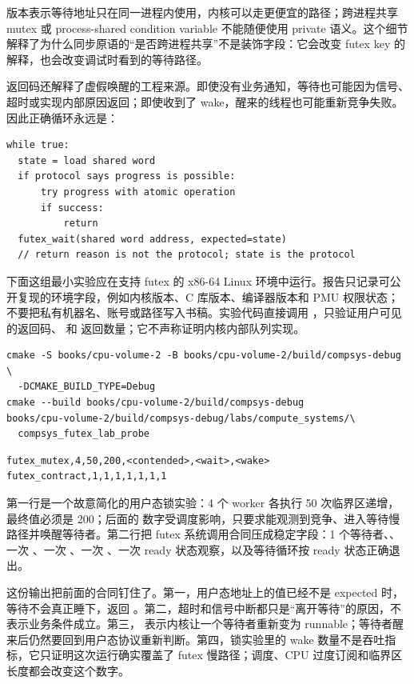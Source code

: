  版本表示等待地址只在同一进程内使用，内核可以走更便宜的路径；跨进程共享 mutex 或 process-shared condition variable 不能随便使用 private 语义。这个细节解释了为什么同步原语的“是否跨进程共享”不是装饰字段：它会改变 futex key 的解释，也会改变调试时看到的等待路径。

返回码还解释了虚假唤醒的工程来源。即使没有业务通知，等待也可能因为信号、超时或实现内部原因返回；即使收到了 wake，醒来的线程也可能重新竞争失败。因此正确循环永远是：

\begin{lstlisting}[numbers=none,caption={futex 用户态循环必须以状态为准}]
while true:
  state = load shared word
  if protocol says progress is possible:
      try progress with atomic operation
      if success:
          return
  futex_wait(shared word address, expected=state)
  // return reason is not the protocol; state is the protocol
\end{lstlisting}

下面这组最小实验应在支持 futex 的 x86-64 Linux 环境中运行。报告只记录可公开复现的环境字段，例如内核版本、C 库版本、编译器版本和 PMU 权限状态；不要把私有机器名、账号或路径写入书稿。实验代码直接调用 ，只验证用户可见的返回码、 和  返回数量；它不声称证明内核内部队列实现。

\begin{lstlisting}[numbers=none,caption={futex 合同实验命令}]
cmake -S books/cpu-volume-2 -B books/cpu-volume-2/build/compsys-debug \
  -DCMAKE_BUILD_TYPE=Debug
cmake --build books/cpu-volume-2/build/compsys-debug
books/cpu-volume-2/build/compsys-debug/labs/compute_systems/\
  compsys_futex_lab_probe
\end{lstlisting}

\begin{lstlisting}[numbers=none,caption={futex 合同实验输出摘要}]
futex_mutex,4,50,200,<contended>,<wait>,<wake>
futex_contract,1,1,1,1,1,1,1
\end{lstlisting}

第一行是一个故意简化的用户态锁实验：4 个 worker 各执行 50 次临界区递增，最终值必须是 200；后面的  数字受调度影响，只要求能观测到竞争、进入等待慢路径并唤醒等待者。第二行把 futex 系统调用合同压成稳定字段：1 个等待者、、一次 、一次 、一次 、一次 ready 状态观察，以及等待循环按 ready 状态正确退出。

这份输出把前面的合同钉住了。第一，用户态地址上的值已经不是 expected 时，等待不会真正睡下，返回 \code{EAGAIN}。第二，超时和信号中断都只是“离开等待”的原因，不表示业务条件成立。第三，\code{wake\_count=1} 表示内核让一个等待者重新变为 runnable；等待者醒来后仍然要回到用户态协议重新判断。第四，锁实验里的 wake 数量不是吞吐指标，它只证明这次运行确实覆盖了 futex 慢路径；调度、CPU 过度订阅和临界区长度都会改变这个数字。

